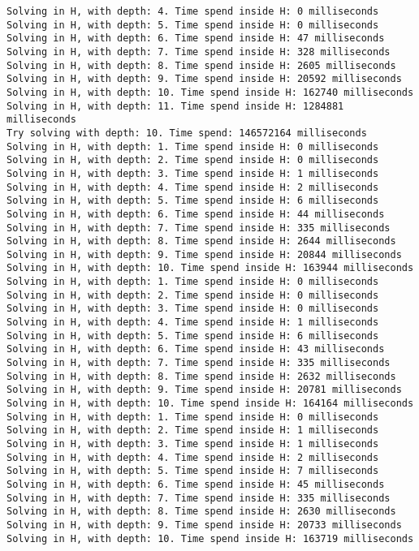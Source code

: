 \begin{lstlisting}[breaklines=true, basicstyle=\ttfamily\footnotesize]
Solving in H, with depth: 4. Time spend inside H: 0 milliseconds
Solving in H, with depth: 5. Time spend inside H: 0 milliseconds
Solving in H, with depth: 6. Time spend inside H: 47 milliseconds
Solving in H, with depth: 7. Time spend inside H: 328 milliseconds
Solving in H, with depth: 8. Time spend inside H: 2605 milliseconds
Solving in H, with depth: 9. Time spend inside H: 20592 milliseconds
Solving in H, with depth: 10. Time spend inside H: 162740 milliseconds
Solving in H, with depth: 11. Time spend inside H: 1284881 milliseconds
Try solving with depth: 10. Time spend: 146572164 milliseconds
Solving in H, with depth: 1. Time spend inside H: 0 milliseconds
Solving in H, with depth: 2. Time spend inside H: 0 milliseconds
Solving in H, with depth: 3. Time spend inside H: 1 milliseconds
Solving in H, with depth: 4. Time spend inside H: 2 milliseconds
Solving in H, with depth: 5. Time spend inside H: 6 milliseconds
Solving in H, with depth: 6. Time spend inside H: 44 milliseconds
Solving in H, with depth: 7. Time spend inside H: 335 milliseconds
Solving in H, with depth: 8. Time spend inside H: 2644 milliseconds
Solving in H, with depth: 9. Time spend inside H: 20844 milliseconds
Solving in H, with depth: 10. Time spend inside H: 163944 milliseconds
Solving in H, with depth: 1. Time spend inside H: 0 milliseconds
Solving in H, with depth: 2. Time spend inside H: 0 milliseconds
Solving in H, with depth: 3. Time spend inside H: 0 milliseconds
Solving in H, with depth: 4. Time spend inside H: 1 milliseconds
Solving in H, with depth: 5. Time spend inside H: 6 milliseconds
Solving in H, with depth: 6. Time spend inside H: 43 milliseconds
Solving in H, with depth: 7. Time spend inside H: 335 milliseconds
Solving in H, with depth: 8. Time spend inside H: 2632 milliseconds
Solving in H, with depth: 9. Time spend inside H: 20781 milliseconds
Solving in H, with depth: 10. Time spend inside H: 164164 milliseconds
Solving in H, with depth: 1. Time spend inside H: 0 milliseconds
Solving in H, with depth: 2. Time spend inside H: 1 milliseconds
Solving in H, with depth: 3. Time spend inside H: 1 milliseconds
Solving in H, with depth: 4. Time spend inside H: 2 milliseconds
Solving in H, with depth: 5. Time spend inside H: 7 milliseconds
Solving in H, with depth: 6. Time spend inside H: 45 milliseconds
Solving in H, with depth: 7. Time spend inside H: 335 milliseconds
Solving in H, with depth: 8. Time spend inside H: 2630 milliseconds
Solving in H, with depth: 9. Time spend inside H: 20733 milliseconds
Solving in H, with depth: 10. Time spend inside H: 163719 milliseconds

\end{lstlisting}
